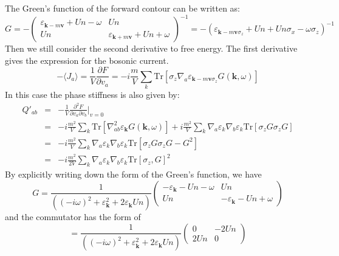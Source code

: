 \documentclass[aps,onecolumn,superscriptaddress,notitlepage,longbibliography]{revtex4-1}
\begin{document}
The Green's function of the forward contour can be written as:
\begin{equation}
  G = - \left(\begin{array}{cc}
    \varepsilon_{\mathbf{k}- m\mathbf{v}} + U n - \omega & U n\\
    U n & \varepsilon_{\mathbf{k}+ m\mathbf{v}} + U n + \omega
  \end{array}\right)^{- 1} = - (\varepsilon_{\mathbf{k}- m\mathbf{v}
  \sigma_z} + U n + U n \sigma_x - \omega \sigma_z)^{- 1}
\end{equation}
Then we still consider the second derivative to free energy. The first
derivative gives the expression for the bosonic current.
\begin{equation}
  - \langle J_a \rangle = \frac{1}{V} \frac{\partial F}{\partial v_a} = -i
  \frac{m}{ V} \sum_k \text{Tr} [\sigma_z \nabla_a
  \varepsilon_{\mathbf{k}- m\mathbf{v} \sigma_z} G (\mathbf{k}, \omega)]
\end{equation}
In this case the phase stiffness is also given by:
\begin{eqnarray}
  Q'_{a b} & = & - \frac{1}{V} \frac{\partial^2 F}{\partial v_a \partial v_b}
  |_{v = 0}  \nonumber\\
  & = & - i\frac{m^2}{V} \sum_k \text{Tr} [\nabla_{a b}^2
  \varepsilon_{\mathbf{k}} G (\mathbf{k}, \omega)] + i\frac{m^2}{
  V} \sum_k \nabla_a \varepsilon_k \nabla_b \varepsilon_k \text{Tr} [\sigma_z
  G \sigma_z G] \\
  & = & - i\frac{m^2}{V} \sum_k \nabla_a \varepsilon_k \nabla_b
  \varepsilon_k \text{Tr} [\sigma_z G \sigma_z G - G^2] \nonumber\\
  & = & - i\frac{m^2}{2 V} \sum_k \nabla_a \varepsilon_k \nabla_b
  \varepsilon_k \text{Tr} [\sigma_z, G]^2 
\end{eqnarray}
By explicitly writing down the form of the Green's function, we have
\begin{equation}
  G = \frac{1}{((-i\omega)^2 + \varepsilon_{\mathbf{k}}^2 + 2
  \varepsilon_{\mathbf{k}} U n)} \left(\begin{array}{cc}
    - \varepsilon_{\mathbf{k}} - U n - \omega & U n\\
    U n & - \varepsilon_{\mathbf{k}} - U n + \omega
  \end{array}\right)
\end{equation}
and the commutator has the form of
\begin{equation}
  [\sigma_z, G] = \frac{1}{((-i\omega)^2 + \varepsilon_{\mathbf{k}}^2 + 2
  \varepsilon_{\mathbf{k}} U n)} \left(\begin{array}{cc}
    0 & - 2 U n\\
    2 U n & 0
  \end{array}\right)
\end{equation}
\end{document}
